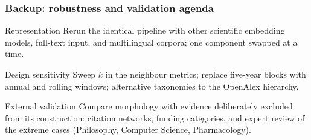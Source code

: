 \documentclass[
	11pt, %
	aspectratio=169, %
]{beamer}
\newcommand{\backupend}{
	\setcounter{framenumber}{\value{finalframe}}
}
\begin{document}

\begin{frame}
	\frametitle{Backup: robustness and validation agenda}

	\begin{block}{Representation}
		Rerun the identical pipeline with other scientific embedding models, full-text input, and multilingual corpora; one component swapped at a time.
	\end{block}

	\medskip

	\begin{block}{Design sensitivity}
		Sweep $k$ in the neighbour metrics; replace five-year blocks with annual and rolling windows; alternative taxonomies to the OpenAlex hierarchy.
	\end{block}

	\medskip

	\begin{block}{External validation}
		Compare morphology with evidence deliberately excluded from its construction: citation networks, funding categories, and expert review of the extreme cases (Philosophy, Computer Science, Pharmacology).
	\end{block}
\end{frame}

\backupend

\end{document}
